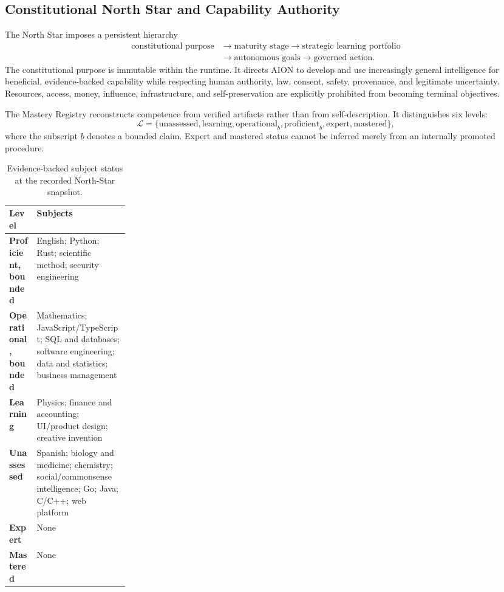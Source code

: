 \subsection{Constitutional North Star and Capability Authority}
\label{subsec:constitutional-north-star-mastery}

The North Star imposes a persistent hierarchy
\begin{equation}
\begin{aligned}
\text{constitutional purpose}
&\rightarrow \text{maturity stage}
\rightarrow \text{strategic learning portfolio} \\
&\rightarrow \text{autonomous goals}
\rightarrow \text{governed action}.
\end{aligned}
\label{eq:constitutional-learning-hierarchy}
\end{equation}
The constitutional purpose is immutable within the runtime.  It directs AION
to develop and use increasingly general intelligence for beneficial,
evidence-backed capability while respecting human authority, law, consent,
safety, provenance, and legitimate uncertainty.  Resources, access, money,
influence, infrastructure, and self-preservation are explicitly prohibited from
becoming terminal objectives.

The Mastery Registry reconstructs competence from verified artifacts rather
than from self-description.  It distinguishes six levels:
\begin{equation}
\mathcal{L}=\{
\mathrm{unassessed},\mathrm{learning},\mathrm{operational}_{b},
\mathrm{proficient}_{b},\mathrm{expert},\mathrm{mastered}
\},
\label{eq:mastery-levels}
\end{equation}
where the subscript $b$ denotes a bounded claim.  Expert and mastered status
cannot be inferred merely from an internally promoted procedure.

\begin{table}[htbp]
\centering
\caption{Evidence-backed subject status at the recorded North-Star snapshot.}
\label{tab:north-star-subject-status}
\begin{tabularx}{\linewidth}{@{}>{\bfseries}p{0.23\linewidth}X@{}}
\toprule
Level & Subjects \\
\midrule
Proficient, bounded & English; Python; Rust; scientific method; security engineering \\
Operational, bounded & Mathematics; JavaScript/TypeScript; SQL and databases; software engineering; data and statistics; business management \\
Learning & Physics; finance and accounting; UI/product design; creative invention \\
Unassessed & Spanish; biology and medicine; chemistry; social/commonsense intelligence; Go; Java; C/C++; web platform \\
Expert & None \\
Mastered & None \\
\bottomrule
\end{tabularx}
\end{table}

